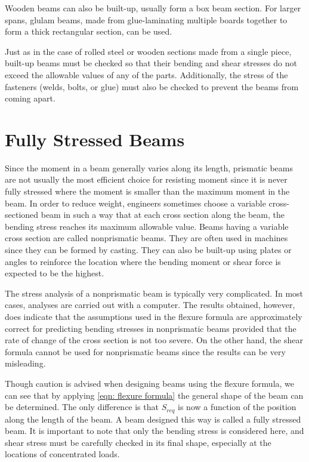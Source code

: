 \documentclass[
10pt,
a4paper,
openany,
svgnames,
]{book}
\begin{document}
Wooden beams can also be built-up, usually form a box beam section. For larger spans, glulam beams, made from glue-laminating multiple boards together to form a thick rectangular section, can be used.

Just as in the case of rolled steel or wooden sections made from a single piece, built-up beams must be checked so that their bending and shear stresses do not exceed the allowable values of any of the parts. Additionally, the stress of the fasteners (welds, bolts, or glue) must also be checked to prevent the beams from coming apart.

\section{Fully Stressed Beams}

Since the moment in a beam generally varies along its length, prismatic beams are not usually the most efficient choice for resisting moment since it is never fully stressed where the moment is smaller than the maximum moment in the beam. In order to reduce weight, engineers sometimes choose a variable cross-sectioned beam in such a way that at each cross section along the beam, the bending stress reaches its maximum allowable value. Beams having a variable cross section are called nonprismatic beams. They are often used in machines since they can be formed by casting. They can also be built-up using plates or angles to reinforce the location where the bending moment or shear force is expected to be the highest.

The stress analysis of a nonprismatic beam is typically very complicated. In most cases, analyses are carried out with a computer. The results obtained, however, does indicate that the assumptions used in the flexure formula are approximately correct for predicting bending stresses in nonprismatic beams provided that the rate of change of the cross section is not too severe. On the other hand, the shear formula cannot be used for nonprismatic beams since the results can be very misleading.

Though caution is advised when designing beams using the flexure formula, we can see that by applying \cref{eqn: flexure formula} the general shape of the beam can be determined. The only difference is that $S_{req}$ is now a function of the position along the length of the beam. A beam designed this way is called a fully stressed beam. It is important to note that only the bending stress is considered here, and shear stress must be carefully checked in its final shape, especially at the locations of concentrated loads.
\end{document}
